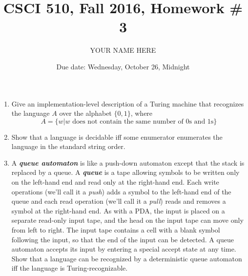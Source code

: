 \documentclass{article}
\title{CSCI 510, Fall 2016, Homework \# 3}
\author{YOUR NAME HERE}
\date{Due date: Wednesday, October 26, Midnight}
\begin{document}
\maketitle
\begin{enumerate}
\item Give an implementation-level description of a Turing machine
  that recognizes the language $A$ over the alphabet $\{0,1\}$, where
  \[
A=  \{w | \mbox{$w$ does not contain the same number of 0s and 1s}\}
\]

\item Show that a language is decidable iff some enumerator enumerates
  the language in the standard string order.

\item A {\bf\em queue automaton} is like a push-down automaton except
  that the stack is replaced by a queue.  A {\bf\em queue} is a tape
  allowing symbols to be written only on the left-hand end and read
  only at the right-hand end.  Each write operations (we'll call it a
  {\em push}) adds a symbol to the left-hand end of the queue and each
  read operation (we'll call it a {\em pull}) reads and removes a
  symbol at the right-hand end.  As with a {\sf PDA}, the input is
  placed on a separate read-only input tape, and the head on the input
  tape can move only from left to right.  The input tape contains a
  cell with a blank symbol following the input, so that the end of the
  input can be detected.  A queue automaton accepts its input by
  entering a special accept state at any time.  Show that a language
  can be recognized by a deterministic queue automaton iff the
  language is Turing-recognizable. 

\end{enumerate}
\end{document}

